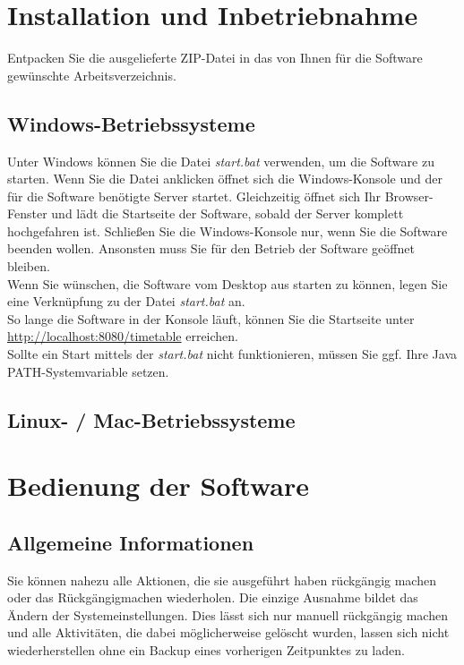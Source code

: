 \documentclass[fontsize=12pt]{scrartcl}
\begin{document}
\section{Installation und Inbetriebnahme}

Entpacken Sie die ausgelieferte ZIP-Datei in das von Ihnen für die Software gewünschte Arbeitsverzeichnis. 

\subsection{Windows-Betriebssysteme}
Unter Windows können Sie die Datei \textit{start.bat} verwenden, um die Software zu starten. Wenn Sie die Datei anklicken öffnet sich die Windows-Konsole und der für die Software benötigte Server startet. Gleichzeitig öffnet sich Ihr Browser-Fenster und lädt die Startseite der Software, sobald der Server komplett hochgefahren ist. Schließen Sie die Windows-Konsole nur, wenn Sie die Software beenden wollen. Ansonsten muss Sie für den Betrieb der Software geöffnet bleiben.\\
Wenn Sie wünschen, die Software vom Desktop aus starten zu können, legen Sie eine Verknüpfung zu der Datei \textit{start.bat} an.\\
So lange die Software in der Konsole läuft, können Sie die Startseite unter \url{http://localhost:8080/timetable} erreichen.\\

Sollte ein Start mittels der \textit{start.bat} nicht funktionieren, müssen Sie ggf. Ihre Java PATH-Systemvariable setzen.

\subsection{Linux- / Mac-Betriebssysteme}

\section{Bedienung der Software}

\subsection{Allgemeine Informationen}

Sie können nahezu alle Aktionen, die sie ausgeführt haben rückgängig machen oder das Rückgängigmachen wiederholen. Die einzige Ausnahme bildet das Ändern der Systemeinstellungen. Dies lässt sich nur manuell rückgängig machen und alle Aktivitäten, die dabei möglicherweise gelöscht wurden, lassen sich nicht wiederherstellen ohne ein Backup eines vorherigen Zeitpunktes zu laden.\\
\end{document}
